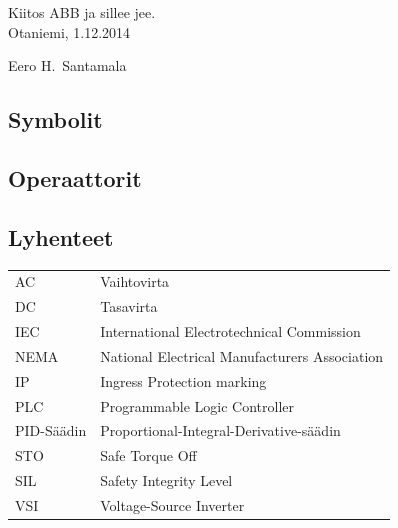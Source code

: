 \documentclass[finnish,12pt,a4paper,pdftex,elec,utf8]{aaltothesis}
\begin{document}

Kiitos ABB ja sillee jee.\\

\vspace{5cm}
Otaniemi, 1.12.2014

\vspace{5mm}
{\hfill Eero H.\ Santamala \hspace{1cm}}

\newpage


\thesistableofcontents



\subsection*{Symbolit}


\subsection*{Operaattorit}



\subsection*{Lyhenteet}

\begin{tabular}{ll}
AC         & Vaihtovirta \\
DC         & Tasavirta \\
IEC	       & International Electrotechnical Commission \\
NEMA       & National Electrical Manufacturers Association \\
IP		   & Ingress Protection marking \\
PLC		   & Programmable Logic Controller \\
PID-Säädin & Proportional-Integral-Derivative-säädin \\
STO		   & Safe Torque Off \\
SIL		   & Safety Integrity Level \\
VSI		   & Voltage-Source Inverter
\end{tabular}


\cleardoublepage
\storeinipagenumber
{}
\setcounter{page}{1}
\end{document}
